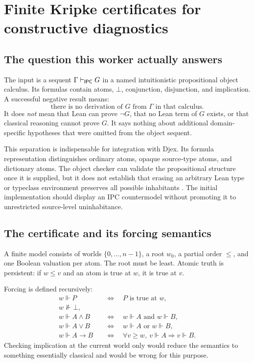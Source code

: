\section{Finite Kripke certificates for constructive diagnostics}
\label{sec:kripke}

\subsection{The question this worker actually answers}
The input is a sequent $\Gamma\vdash_{\mathsf{IPC}}G$ in a named intuitionistic
propositional object calculus. Its formulas contain atoms, $\bot$, conjunction,
disjunction, and implication. A successful negative result means:
\[
 \text{there is no derivation of }G\text{ from }\Gamma\text{ in that calculus}.
\]
It does \emph{not} mean that Lean can prove $\neg G$, that no Lean term of
$G$ exists, or that classical reasoning cannot prove $G$. It says nothing about
additional domain-specific hypotheses that were omitted from the object sequent.

This separation is indispensable for integration with Djex. Its formula
representation distinguishes ordinary atoms, opaque source-type atoms, and
dictionary atoms. The object checker can validate the propositional structure
once it is supplied, but it does not establish that erasing an arbitrary Lean
type or typeclass environment preserves all possible inhabitants
\cite{djex-formula}. The initial implementation should display an IPC
countermodel without promoting it to unrestricted source-level uninhabitance.

\subsection{The certificate and its forcing semantics}
A finite model consists of worlds $\{0,\ldots,n-1\}$, a root $w_0$, a partial
order $\le$, and one Boolean valuation per atom. The root must be least.
Atomic truth is persistent: if $w\le v$ and an atom is true at $w$, it is
true at $v$.

Forcing is defined recursively:
\begin{align*}
 w\Vdash P &\quad\Longleftrightarrow\quad P\text{ is true at }w,\\
 w\nVdash\bot,&\\
 w\Vdash A\land B &\quad\Longleftrightarrow\quad w\Vdash A\text{ and }w\Vdash B,\\
 w\Vdash A\lor B &\quad\Longleftrightarrow\quad w\Vdash A\text{ or }w\Vdash B,\\
 w\Vdash A\to B &\quad\Longleftrightarrow\quad
 \forall v\ge w,\ v\Vdash A\Longrightarrow v\Vdash B.
\end{align*}
Checking implication at the current world only would reduce the semantics to
something essentially classical and would be wrong for this purpose.

